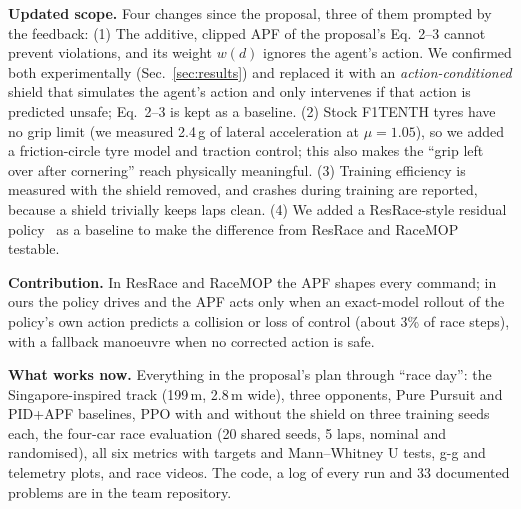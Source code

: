 \documentclass[conference]{IEEEtran}
\begin{document}
\textbf{Updated scope.} Four changes since the proposal, three of them prompted by the feedback:
(1) The additive, clipped APF of the proposal's Eq.~2--3 cannot prevent violations, and its weight $w(d)$ ignores
the agent's action. We confirmed both experimentally (Sec.~\ref{sec:results}) and replaced it with an
\emph{action-conditioned} shield that simulates the agent's action and only intervenes if that action is predicted
unsafe; Eq.~2--3 is kept as a baseline. (2) Stock F1TENTH tyres have no grip limit (we measured 2.4\,g of lateral
acceleration at $\mu = 1.05$), so we added a friction-circle tyre model and traction control; this also makes the
``grip left over after cornering'' reach physically meaningful. (3) Training efficiency is measured with the shield
removed, and crashes during training are reported, because a shield trivially keeps laps clean. (4) We added a
ResRace-style residual policy~\cite{zhang2022} as a baseline to make the difference from ResRace and
RaceMOP~\cite{trumpp2024} testable.

\textbf{Contribution.} In ResRace and RaceMOP the APF shapes every command; in ours the policy drives and the APF
acts only when an exact-model rollout of the policy's own action predicts a collision or loss of control (about
3\% of race steps), with a fallback manoeuvre when no corrected action is safe.

\textbf{What works now.} Everything in the proposal's plan through ``race day'': the Singapore-inspired track
(199\,m, 2.8\,m wide), three opponents, Pure Pursuit and PID+APF baselines, PPO with and without the shield on
three training seeds each, the four-car race evaluation (20 shared seeds, 5 laps, nominal and randomised), all six
metrics with targets and Mann--Whitney U tests, g-g and telemetry plots, and race videos. The code, a log of every
run and 33 documented problems are in the team repository.
\end{document}
